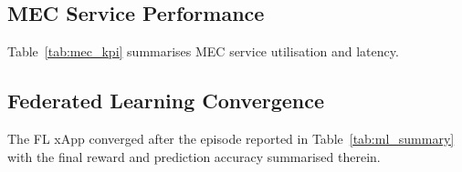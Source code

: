 \subsection{MEC Service Performance}
Table~\ref{tab:mec_kpi} summarises MEC service utilisation and latency.



\subsection{Federated Learning Convergence}
The FL xApp converged after the episode reported in
Table~\ref{tab:ml_summary} with the final reward and prediction accuracy
summarised therein.


